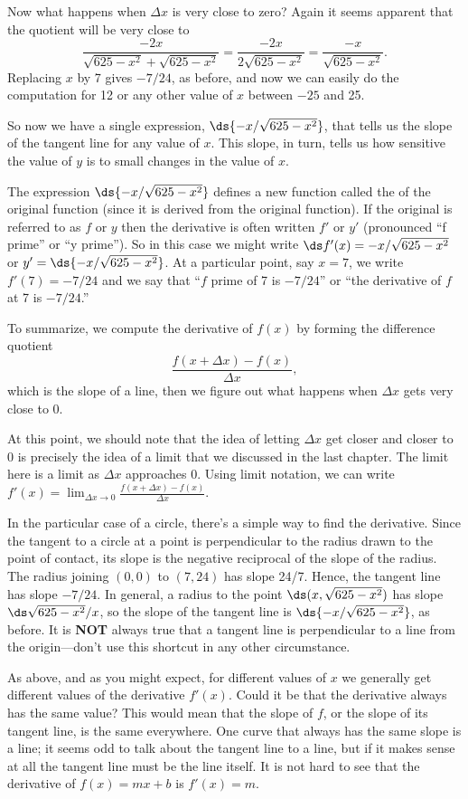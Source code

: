 Now what happens when $\Delta x$ is very close to zero? Again it seems
apparent that the quotient will be very close to
$$\frac{-2x}{\sqrt{625-x^2}+\sqrt{625-x^2}}
=\frac{-2x}{2\sqrt{625-x^2}}=\frac{-x}{\sqrt{625-x^2}}.
$$
Replacing $x$ by 7 gives $-7/24$, as before, and now we can easily do
the computation for 12  or any other value of
$x$ between $-25$ and 25.

So now we have a single expression, $\ds {-x/ \sqrt{625-x^2}}$,
that tells us the slope of the tangent line for any value of
$x$. This slope, in turn, tells us how sensitive the value of $y$ is
to small changes in the value of $x$. 

The expression $\ds {-x/ \sqrt{625-x^2}}$ defines a new function
 called the  of the
original function (since it is derived from the original function).
 If the original is referred to as $f$ or $y$ then
the derivative is often written $f'$ or $y'$ (pronounced ``f
prime'' or ``y prime''). So in this case we might write $\ds f'(x)=-x/
\sqrt{625-x^2}$ or $y'=\ds {-x/ \sqrt{625-x^2}}$. At a particular point, say $x=7$, we write
$f'(7)=-7/24$ and we say that ``$f$ prime of 7 is $-7/24$'' or ``the derivative of
$f$ at 7 is $-7/24$.''

To summarize, we compute the derivative of $f(x)$ by forming the
difference quotient
$$
\frac{f(x+\Delta x)-f(x)}{\Delta x},
$$
which is the slope of a line, then we figure out what happens when
$\Delta x$ gets very close to 0. 

At this point, we should note that the idea of letting $\Delta x$ get closer and closer to 0
is precisely the idea of a limit that we discussed in the last chapter. The limit here is a limit
as $\Delta x$ approaches 0. Using limit notation, we can write
$f'(x)=\lim_{\Delta x\to 0}\frac{f(x+\Delta x)-f(x)}{\Delta x}$.

In the particular case of a circle, there's a simple way to find the
derivative.  Since the tangent to a circle at a point is perpendicular to
the radius drawn to the point of contact, its slope is the negative
reciprocal of the slope of the radius.  The radius joining $(0,0)$ to
$(7,24)$ has slope 24/7.  Hence, the tangent line has slope
$-7/24$. In general, a radius to the point $\ds (x,\sqrt{625-x^2})$ has
slope $\ds \sqrt{625-x^2}/x$, so the slope of the tangent line is
$\ds {-x/ \sqrt{625-x^2}}$, as before. It is {\bf NOT} always true that a
tangent line is perpendicular to a line from the origin---don't use
this shortcut in any other circumstance.

As above, and as you might expect, for different values of $x$ we
generally get different values of the derivative $f'(x)$. Could it be
that the derivative always has the same value? This would mean that
the slope of $f$, or the slope of its tangent line, is the same
everywhere. One curve that always has the same slope is a line; it
seems odd to talk about the tangent line to a line, but if it makes
sense at all the tangent line must be the line itself. It is not hard
to see that the derivative of $f(x)=mx+b$ is $f'(x)=m$.